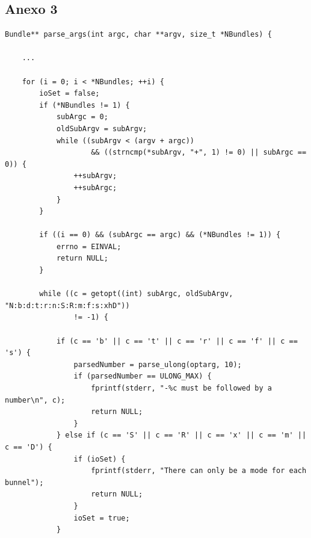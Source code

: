 \documentclass[a4paper]{article}
\begin{document}
\subsection*{Anexo 3}
\begin{verbatim}
Bundle** parse_args(int argc, char **argv, size_t *NBundles) {

    ...

    for (i = 0; i < *NBundles; ++i) {
        ioSet = false;
        if (*NBundles != 1) {
            subArgc = 0;
            oldSubArgv = subArgv;
            while ((subArgv < (argv + argc))
                    && ((strncmp(*subArgv, "+", 1) != 0) || subArgc == 0)) {
                ++subArgv;
                ++subArgc;
            }
        }

        if ((i == 0) && (subArgc == argc) && (*NBundles != 1)) {
            errno = EINVAL;
            return NULL;
        }

        while ((c = getopt((int) subArgc, oldSubArgv, "N:b:d:t:r:n:S:R:m:f:s:xhD"))
                != -1) {

            if (c == 'b' || c == 't' || c == 'r' || c == 'f' || c == 's') {
                parsedNumber = parse_ulong(optarg, 10);
                if (parsedNumber == ULONG_MAX) {
                    fprintf(stderr, "-%c must be followed by a number\n", c);
                    return NULL;
                }
            } else if (c == 'S' || c == 'R' || c == 'x' || c == 'm' || c == 'D') {
                if (ioSet) {
                    fprintf(stderr, "There can only be a mode for each bunnel");
                    return NULL;
                }
                ioSet = true;
            }


\end{verbatim}
\end{document}
